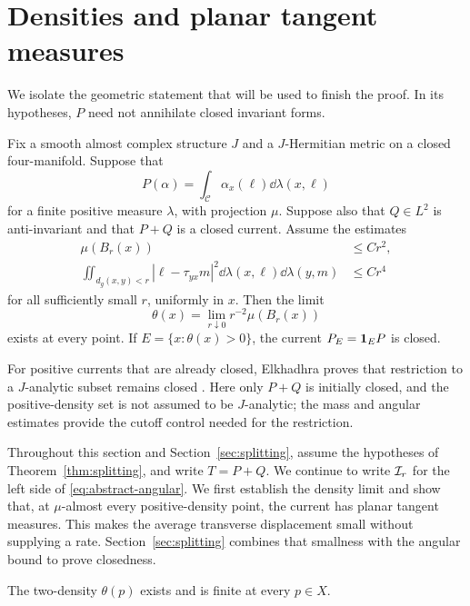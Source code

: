 \section{Densities and planar tangent measures}\label{sec:density}

We isolate the geometric statement that will be used to finish
the proof. In its hypotheses, \(P\) need not annihilate closed
invariant forms.

\begin{theorem}
\label{thm:splitting}
Fix a smooth almost complex structure \(J\) and a \(J\)-Hermitian
metric on a closed four-manifold. Suppose that
\[
P(\alpha)=\int_{\mathscr C}\alpha_x(\ell)\dd\lambda(x,\ell)
\]
for a finite positive measure \(\lambda\), with projection \(\mu\).
Suppose also that \(Q\in L^2\) is anti-invariant and that \(P+Q\)
is a closed current. Assume the estimates
\begin{align}
\mu(B_r(x))&\le Cr^2,\label{eq:abstract-growth}\\
\iint_{d_g(x,y)<r}|\ell-\tau_{yx}m|^2
\dd\lambda(x,\ell)\dd\lambda(y,m)&\le Cr^4
\label{eq:abstract-angular}
\end{align}
for all sufficiently small \(r\), uniformly in \(x\).
Then the limit
\[
\theta(x)=\lim_{r\downarrow0}r^{-2}\mu(B_r(x))
\]
exists at every point. If \(E=\{x:\theta(x)>0\}\), the
current \(P_E=\mathbf 1_EP\) is closed.
\end{theorem}

For positive currents that are already closed, Elkhadhra proves
that restriction to a \(J\)-analytic subset remains closed
\cite[Section~3.2, Lemma~1, author version]{Elkhadhra2014}.
Here only \(P+Q\) is initially closed, and the positive-density
set is not assumed to be \(J\)-analytic; the mass and angular
estimates provide the cutoff control needed for the restriction.

Throughout this section and Section~\ref{sec:splitting}, assume
the hypotheses of Theorem~\ref{thm:splitting}, and write \(T=P+Q\).
We continue to write \(\mathcal I_r\) for the left side of
\eqref{eq:abstract-angular}. We first establish the density
limit and show that, at \(\mu\)-almost every positive-density point,
the current has planar tangent measures. This makes the average
transverse displacement small without supplying a rate.
Section~\ref{sec:splitting} combines that smallness with the
angular bound to prove closedness.

\begin{lemma}\label{lem:density}
The two-density \(\theta(p)\) exists and is finite at every
\(p\in X\).
\end{lemma}

